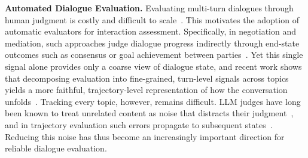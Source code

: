 \documentclass{llmxive}
\begin{document}
\smallskip\smallskip\noindent\textbf{Automated Dialogue Evaluation.} 
Evaluating multi-turn dialogues through human judgment is costly and difficult to scale~\citep{zheng2023judging, deshpande2025multichallenge}. This motivates the adoption of automatic evaluators for interaction assessment. 
%
Specifically, in negotiation and mediation, such approaches judge dialogue progress indirectly through end-state outcomes such as consensus or goal achievement between parties~\citep{zhou2024sotopia, chen2026simulating}.
%
Yet this single signal alone provides only a coarse view of dialogue state, and recent work shows that decomposing evaluation into fine-grained, turn-level signals across topics yields a more faithful, trajectory-level representation of how the conversation unfolds~\citep{mannekote2023agreement, zhang2025sotopia, liu2025promediate}.
%
Tracking every topic, however, remains difficult. LLM judges have long been known to treat unrelated content as noise that distracts their judgment~\citep{ye2025justice}, and in trajectory evaluation such errors propagate to subsequent states~\citep{liu2025promediate}. Reducing this noise has thus become an increasingly important direction for reliable dialogue
evaluation.










\end{document}
